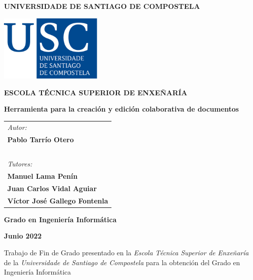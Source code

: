 \pagestyle{empty}
\begin{center}
	{\bf\Large UNIVERSIDADE DE SANTIAGO DE COMPOSTELA}
	
	\vspace{0.5cm}
	\includegraphics[width=5cm]{figuras/logo_usc.eps}
	
	\vspace{0.5cm}
	{\bf\large ESCOLA TÉCNICA SUPERIOR DE ENXEÑARÍA}
	
	\vspace{3cm}
	{\bf\LARGE Herramienta para la creación y edición colaborativa de documentos}
	
\end{center}

\vspace{2cm}
\hspace{4cm}\begin{tabular}{l}
	{\it\Large Autor:} \\
	{\bf\Large Pablo Tarrío Otero} \\
	~ \\
	{\it\Large Tutores:} \\
	{\bf\Large Manuel Lama Penín} \\
	{\bf\Large Juan Carlos Vidal Aguiar} \\
	{\bf\Large Víctor José Gallego Fontenla} \\
\end{tabular}

\vspace{2cm}
\begin{center}
	{\bf\Large Grado en Ingeniería Informática}
	
	\vspace{0.5cm}
	{\bf\large Junio 2022}
	
	\vspace{0.5cm}
	Trabajo de Fin de Grado presentado en la {\it Escola Técnica Superior de Enxeñaría} de la {\it Universidade de Santiago de Compostela} para la obtención del Grado en Ingeniería Informática
\end{center}